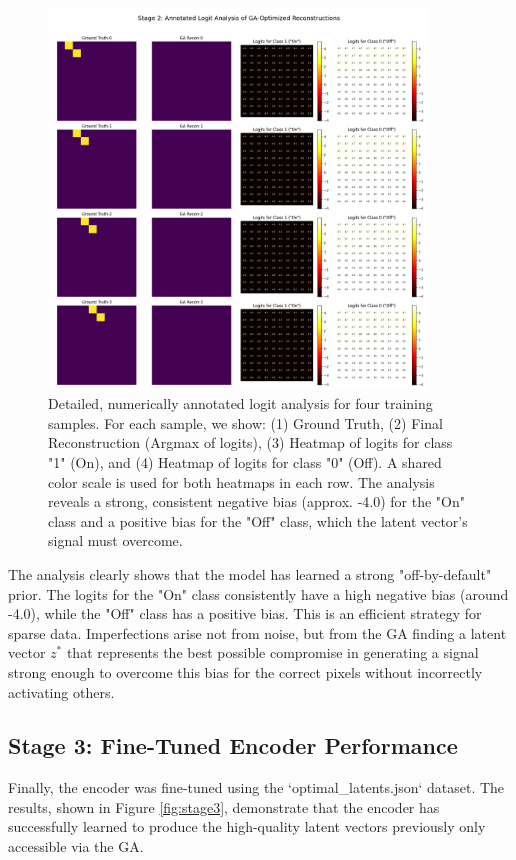 \documentclass[11pt, a4paper, twocolumn]{article}
\begin{document}
\begin{strip}
\begin{figure}[H]
    \centering
    \includegraphics[width=0.9\textwidth]{stage2_logit_analysis_annotated.png}
    \caption{Detailed, numerically annotated logit analysis for four training samples. For each sample, we show: (1) Ground Truth, (2) Final Reconstruction (Argmax of logits), (3) Heatmap of logits for class "1" (On), and (4) Heatmap of logits for class "0" (Off). A shared color scale is used for both heatmaps in each row. The analysis reveals a strong, consistent negative bias (approx. -4.0) for the "On" class and a positive bias for the "Off" class, which the latent vector's signal must overcome.}
    \label{fig:logits}
\end{figure}
\end{strip}

The analysis clearly shows that the model has learned a strong "off-by-default" prior. The logits for the "On" class consistently have a high negative bias (around -4.0), while the "Off" class has a positive bias. This is an efficient strategy for sparse data. Imperfections arise not from noise, but from the GA finding a latent vector $z^*$ that represents the best possible compromise in generating a signal strong enough to overcome this bias for the correct pixels without incorrectly activating others.

\subsection{Stage 3: Fine-Tuned Encoder Performance}
Finally, the encoder was fine-tuned using the `optimal_latents.json` dataset. The results, shown in Figure \ref{fig:stage3}, demonstrate that the encoder has successfully learned to produce the high-quality latent vectors previously only accessible via the GA.
\end{document}
